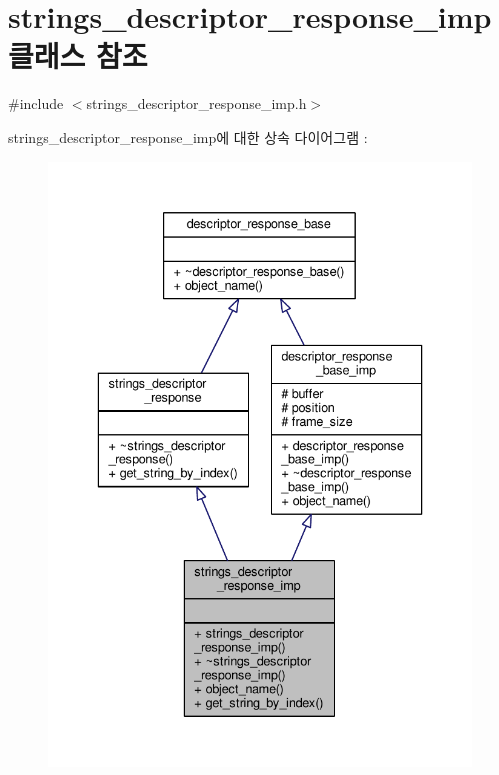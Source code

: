 \hypertarget{classavdecc__lib_1_1strings__descriptor__response__imp}{}\section{strings\+\_\+descriptor\+\_\+response\+\_\+imp 클래스 참조}
\label{classavdecc__lib_1_1strings__descriptor__response__imp}


{\ttfamily \#include $<$strings\+\_\+descriptor\+\_\+response\+\_\+imp.\+h$>$}



strings\+\_\+descriptor\+\_\+response\+\_\+imp에 대한 상속 다이어그램 \+: 
\nopagebreak
\begin{figure}[H]
\begin{center}
\leavevmode
\includegraphics[width=336pt]{classavdecc__lib_1_1strings__descriptor__response__imp__inherit__graph}
\end{center}
\end{figure}


